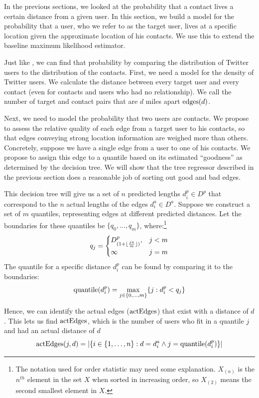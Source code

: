 In the previous sections, we looked at the probability that a contact lives a
certain distance from a given user.
%
In this section, we build a model for the probability that a user, who we refer
to as the target user, lives at a specific location given the approximate
location of his contacts.
%
We use this to extend the baseline maximum likelihood estimator.


Just like \cite{backstrom2010find}, we can find that probability by comparing
the distribution of Twitter users to the distribution of the contacts.
%
First, we need a model for the density of Twitter users.
%
We calculate the distance between every target user and every contact
(even for contacts and users who had no relationship).
%
We call the number of target and contact pairs that are $d$ miles apart
$\operatorname{edges}(d)$.

Next, we need to model the probability that two users are contacts.
%
We propose to assess the relative quality of each edge from a target
user to his contacts, so that edges conveying strong location information are
weighed more than others.
%
Concretely, suppose we have a single edge from a user to one of his contacts.
%
We propose to assign this edge to a quantile based on its estimated
``goodness'' as determined by the decision tree.
%
We will show that the tree regressor described in the previous section does a
reasonable job of sorting out good and bad edges.

This decision tree will give us a set of $n$ predicted lengths $d^p_i \in D^p$
that correspond to the $n$ actual lengths of the edges $d^a_i \in D^a$.
%
Suppose we construct a set of $m$ quantiles, representing edges at different
predicted distances.
%
Let the boundaries for these quantiles be $\{q_0,\dots,q_m\}$,
where:\footnote{The notation used for order statistic may need some
    explanation.  $X_{(n)}$ is the $n^{th}$ element in the set $X$ when sorted
    in increasing order, so $X_{(2)}$ means the second smallest element in
$X$.}
\[
    q_j =
    \begin{cases}
        D^p_{(1+\lfloor {jn\over m} \rfloor)}, & j<m \\
        \infty & j=m
    \end{cases}
\]
\noindent The quantile for a specific distance $d^p_i$ can be found by
comparing it to the boundaries:
\[
    \operatorname{quantile}(d^p_i) = \max_{j \in \{0,\dots,m\}} \{j: d^p_i<q_j\}
\]

Hence, we can identify the actual edges ($\operatorname{actEdges}$) that exist with a distance of $d$.
%
This lets us find $\operatorname{actEdges}$, which is the number of users who fit in a quantile $j$ and had an actual distance of $d$
\[
    \operatorname{actEdges}(j,d) = |\{
            i \in \{1,\dots,n\} :
            d=d^a_i \wedge j=\operatorname{quantile}(d^p_i)
        \}|
\]

